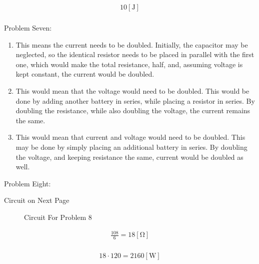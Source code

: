 \documentclass[12pt]{article}
\begin{document}
\begin{equation}
  \begin{split}
    10[\si{\joule}]\\
  \end{split}
  \label{15}
\end{equation}

\hline
\newpage

\begin{center}
  Problem Seven:
\end{center}
\hline

\begin{enumerate}

  \item This means the current needs to be doubled. Initially, the capacitor may be neglected, so the identical resistor needs to be placed in parallel with the first one, which would make the total resistance, half, and, assuming voltage is kept constant, the current would be doubled.

  \item This would mean that the voltage would need to be doubled. This would be done by adding another battery in series, while placing a resistor in series. By doubling the resistance, while also doubling the voltage, the current remains the same.

  \item This would mean that current and voltage would need to be doubled. This may be done by simply placing an additional battery in series. By doubling the voltage, and keeping resistance the same, current would be doubled as well.

\end{enumerate}

\hline
\newpage

\begin{center}
  Problem Eight:
\end{center}
\hline

\begin{center}
  Circuit on Next Page
\end{center}

\begin{figure}[H]
  \centering
  
  \caption{Circuit For Problem 8}
  \label{fig:7}
\end{figure}

\begin{equation}
  \begin{split}
    \frac{108}{6}=18[\si{\ohm}]\\
  \end{split}
  \label{16}
\end{equation}

\begin{equation}
  \begin{split}
    18\cdot120=2160[\si{\watt}]\\
  \end{split}
  \label{17}
\end{equation}

\hline
\end{document}
